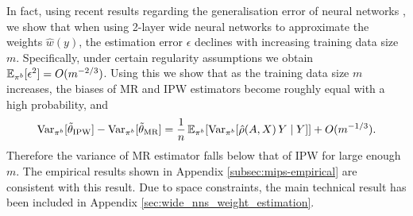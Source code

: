 In fact, using recent results regarding the generalisation error of neural networks \citep{lai2023generalization}, we show that when using 2-layer wide neural networks to approximate the weights $\hat{w}(y)$, the estimation error $\epsilon$ declines with increasing training data size $m$. Specifically, under certain regularity assumptions we obtain $\mathbb{E}_{\pi^b}[\epsilon^2] = O(m^{-2/3})$. Using this we show that as the training data size $m$ increases, the biases of MR and IPW estimators become roughly equal with a high probability, and
\[
\textup{Var}_{\pi^b}[\tilde{\theta}_{\textup{IPW}}] - \textup{Var}_{\pi^b}[\tilde{\theta}_{\textup{MR}}] = \frac{1}{n}\,\mathbb{E}_{\pi^b}[\textup{Var}_{\pi^b}[\hat{\rho}(A, X)\,Y\mid Y]] + O(m^{-1/3}).
\]
Therefore the variance of MR estimator falls below that of IPW for large enough $m$. The empirical results shown in Appendix \ref{subsec:mips-empirical} are consistent with this result. Due to space constraints, the main technical result has been included in Appendix \ref{sec:wide_nns_weight_estimation}.



